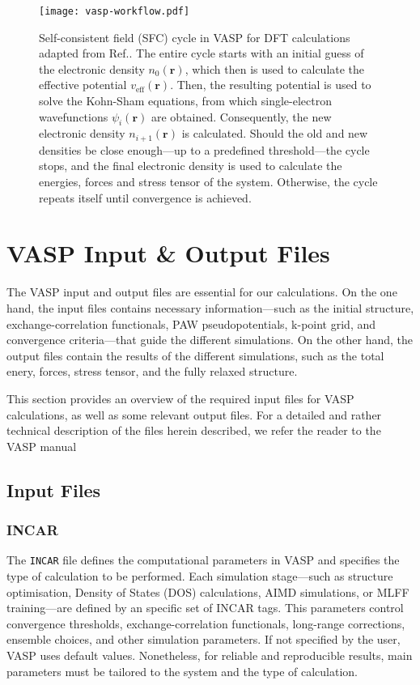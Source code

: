 \begin{figure}[h]
    \centering
    \texttt{[image: vasp-workflow.pdf]}
    \caption{
        Self-consistent field (SFC) cycle in VASP for DFT calculations adapted from Ref.\supercite{sholl2023density}. The entire cycle starts with an initial guess of the electronic density $n_0(\mathbf{r})$, which then is used to calculate the effective potential $v_{\text{eff}}(\mathbf{r})$. Then, the resulting potential is used to solve the Kohn-Sham equations, from which single-electron wavefunctions $\psi_i(\mathbf{r})$ are obtained. Consequently, the new electronic density $n_{i+1}(\mathbf{r})$ is calculated. Should the old and new densities be close enough---up to a predefined threshold---the cycle stops, and the final electronic density is used to calculate the energies, forces and stress tensor of the system. Otherwise, the cycle repeats itself until convergence is achieved. 
    }
    \label{fig:vasp_workflow}
\end{figure}

\section{VASP Input \& Output Files}
The VASP input and output files are essential for our calculations. On the one hand, the input files contains necessary information---such as the initial structure, exchange-correlation functionals, PAW pseudopotentials, k-point grid, and convergence criteria---that guide the different simulations. On the other hand, the output files contain the results of the different simulations, such as the total enery, forces, stress tensor, and the fully relaxed structure.

This section provides an overview of the required input files for VASP calculations, as well as some relevant output files. For a detailed and rather technical description of the files herein described, we refer the reader to the VASP manual\supercite{zotero-item-672}

\subsection{Input Files}
\subsubsection{INCAR}
The \texttt{INCAR} file defines the computational parameters in VASP and specifies the type of calculation to be performed. Each simulation stage---such as structure optimisation, Density of States (DOS) calculations, AIMD simulations, or MLFF training---are defined by an specific set of INCAR tags. This parameters control convergence thresholds, exchange-correlation functionals, long-range corrections, ensemble choices, and other simulation parameters. If not specified by the user, VASP uses default values. Nonetheless, for reliable and reproducible results, main parameters must be tailored to the system and the type of calculation.


